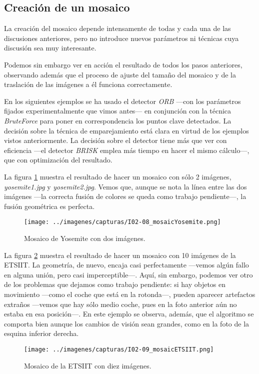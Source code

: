 \documentclass[a4paper, 11pt]{article}
\theoremstyle{definition}
\theoremstyle{theorem}
\begin{document}
    \subsection{Creación de un mosaico}
    La creación del mosaico depende intensamente de todas y cada una de las discusiones anteriores, pero no introduce nuevos parámetros ni técnicas cuya discusión sea muy interesante.

    Podemos sin embargo ver en acción el resultado de todos los pasos anteriores, observando además que el proceso de ajuste del tamaño del mosaico y de la traslación de las imágenes a él funciona correctamente.

    En los siguientes ejemplos se ha usado el detector \emph{ORB} ---con los parámetros fijados experimentalmente que vimos antes--- en conjunción con la técnica \emph{BruteForce} para poner en correspondencia los puntos clave detectados. La decisión sobre la técnica de emparejamiento está clara en virtud de los ejemplos vistos anteriormente. La decisión sobre el detector tiene más que ver con eficiencia ---el detector \emph{BRISK} emplea más tiempo en hacer el mismo cálculo---, que con optimización del resultado.

    La figura \ref{mosaicoY} muestra el resultado de hacer un mosaico con sólo 2 imágenes, \emph{yosemite1.jpg} y \emph{yosemite2.jpg}. Vemos que, aunque se nota la línea entre las dos imágenes ---la correcta fusión de colores se queda como trabajo pendiente---, la fusión geométrica es perfecta.

    \begin{figure}[ht!]
        \centering
        \texttt{[image: ../imagenes/capturas/I02-08\_mosaicYosemite.png]}
        \caption{Mosaico de Yosemite con dos imágenes. \label{mosaicoY}}
    \end{figure}

    La figura \ref{mosaicoE} muestra el resultado de hacer un mosaico con 10 imágenes de la ETSIIT. La geometría, de nuevo, encaja casi perfectamente ---vemos algún fallo en alguna unión, pero casi imperceptible---. Aquí, sin embargo, podemos ver otro de los problemas que dejamos como trabajo pendiente: si hay objetos en movimiento ---como el coche que está en la rotonda---, pueden aparecer artefactos extraños ---vemos que hay sólo medio coche, pues en la foto anterior aún no estaba en esa posición---. En este ejemplo se observa, además, que el algoritmo se comporta bien aunque los cambios de visión sean grandes, como en la foto de la esquina inferior derecha.

    \begin{figure}[ht!]
        \centering
        \texttt{[image: ../imagenes/capturas/I02-09\_mosaicETSIIT.png]}
        \caption{Mosaico de la ETSIIT con diez imágenes. \label{mosaicoE}}
    \end{figure}
\end{document}
